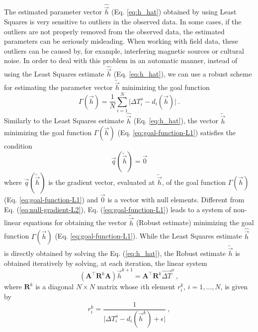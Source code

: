 \documentclass[journal abbreviation, npg]{copernicus}
\begin{document}
The estimated parameter vector $\hat{\vec{h}}$ (Eq. \ref{eq:h_hat}) obtained by using Least Squares is very sensitive to outliers in the observed data. In some cases, if the outliers are not properly removed from the observed data, the estimated parameters can be seriously misleading. When working with field data, these outliers can be caused by, for example, interfering magnetic sources or cultural noise. In order to deal with this problem in an automatic manner, instead of using the Least Squares estimate $\hat{\vec{h}}$ (Eq. \ref{eq:h_hat}), we can use a robust scheme for estimating the parameter vector $\tilde{\vec{h}}$ minimizing the goal function
\begin{equation}
\Gamma(\vec{h}) = \frac{1}{N} \sum_{i = 1}^{N} 
\vert \Delta T^{o}_{i} - d_{i}(\vec{h}) \vert \: .
\label{eq:goal-function-L1}
\end{equation}
Similarly to the Least Squares estimate $\hat{\vec{h}}$ (Eq. \ref{eq:h_hat}), the vector $\tilde{\vec{h}}$ minimizing the goal function $\Gamma(\vec{h})$ (Eq. \ref{eq:goal-function-L1}) satisfies the condition
\begin{equation}
\vec{q}(\tilde{\vec{h}}) = \vec{0}
\label{eq:null-gradient-L1}
\end{equation}
where $\vec{q}(\tilde{\vec{h}})$ is the gradient vector, evaluated at $\tilde{\vec{h}}$, of the goal function $\Gamma(\vec{h})$ (Eq. \ref{eq:goal-function-L1}) and $\vec{0}$ is a vector with null elements. Different from Eq. (\ref{eq:null-gradient-L2}), Eq. (\ref{eq:goal-function-L1}) leads to a system of non-linear equations for obtaining the vector $\tilde{\vec{h}}$ (Robust estimate) minimizing the goal function $\Gamma(\vec{h})$ (Eq. \ref{eq:goal-function-L1}). While the Least Squares estimate $\hat{\vec{h}}$ is directly obtained by solving the Eq. (\ref{eq:h_hat}), the Robust estimate $\tilde{\vec{h}}$ is obtained iteratively by solving, at each iteration, the linear system
\begin{equation}
\left( \mathbf{A}^{\intercal} \mathbf{R}^{k} \mathbf{A} \right) \vec{h}^{k+1} =
\mathbf{A}^{\intercal} \mathbf{R}^{k} \vec{\Delta T}^{o} \: ,
\label{eq:iteration-L1}
\end{equation}
where $\mathbf{R}^{k}$ is a diagonal $N \times N$ matrix whose $i$th element $r_{i}^{k}$, $i = 1, ..., N$, is given by
\begin{equation}
r_{i}^{k} = \dfrac{1}{\vert \Delta T^{o}_{i} - d_{i}(\vec{h}^{k}) + \epsilon \vert} \: ,
\label{eq:ri}
\end{equation}
\end{document}
